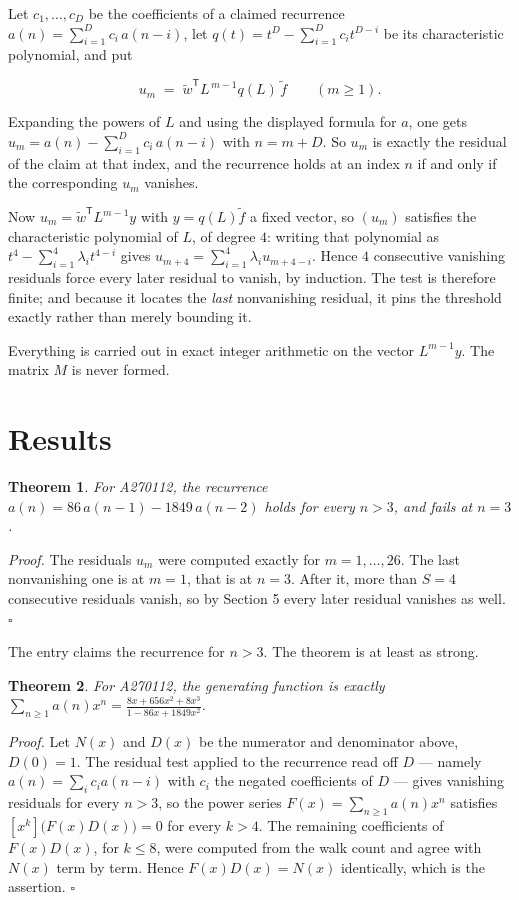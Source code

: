 \documentclass[11pt]{article}
\newtheorem{theorem}{Theorem}
\theoremstyle{definition}
\begin{document}
Let $c_1,\dots,c_D$ be the coefficients of a claimed recurrence $a(n) = \sum_{i=1}^{D} c_i\,a(n-i)$, let $q(t) = t^{D} - \sum_{i=1}^{D} c_i t^{D-i}$ be its characteristic polynomial, and put

\[u_m \;=\; \tilde w^{\mathsf T} L^{\,m-1} q(L)\,\tilde f \qquad (m \ge 1).\]

Expanding the powers of $L$ and using the displayed formula for $a$, one gets $u_m = a(n) - \sum_{i=1}^{D} c_i\,a(n-i)$ with $n = m + D$. So $u_m$ is exactly the residual of the claim at that index, and the recurrence holds at an index $n$ if and only if the corresponding $u_m$ vanishes.

Now $u_m = \tilde w^{\mathsf T} L^{m-1} y$ with $y = q(L)\tilde f$ a fixed vector, so $(u_m)$ satisfies the characteristic polynomial of $L$, of degree $4$: writing that polynomial as $t^{4} - \sum_{i=1}^{4} \lambda_i t^{4-i}$ gives $u_{m+4} = \sum_{i=1}^{4} \lambda_i u_{m+4-i}$. Hence $4$ consecutive vanishing residuals force every later residual to vanish, by induction. The test is therefore finite; and because it locates the {\itshape last} nonvanishing residual, it pins the threshold exactly rather than merely bounding it.

Everything is carried out in exact integer arithmetic on the vector $L^{m-1}y$. The matrix $M$ is never formed.

\section{Results}

\begin{theorem} For A270112, the recurrence $a(n) = 86\,a(n-1) - 1849\,a(n-2)$ holds for every $n > 3$, and fails at $n = 3$.\end{theorem}

{\itshape Proof.} The residuals $u_m$ were computed exactly for $m = 1,\dots,26$. The last nonvanishing one is at $m = 1$, that is at $n = 3$. After it, more than $S = 4$ consecutive residuals vanish, so by Section 5 every later residual vanishes as well. $\square$

The entry claims the recurrence for $n > 3$. The theorem is at least as strong.

\begin{theorem} For A270112, the generating function is exactly $\sum_{n\ge 1} a(n)x^n = \frac{8x + 656x^{2} + 8x^{3}}{1 - 86x + 1849x^{2}}$.\end{theorem}

{\itshape Proof.} Let $N(x)$ and $D(x)$ be the numerator and denominator above, $D(0)=1$. The residual test applied to the recurrence read off $D$ --- namely $a(n) = \sum_i c_i a(n-i)$ with $c_i$ the negated coefficients of $D$ --- gives vanishing residuals for every $n > 3$, so the power series $F(x)=\sum_{n\ge 1}a(n)x^n$ satisfies $[x^k]\bigl(F(x)D(x)\bigr) = 0$ for every $k > 4$. The remaining coefficients of $F(x)D(x)$, for $k \le 8$, were computed from the walk count and agree with $N(x)$ term by term. Hence $F(x)D(x) = N(x)$ identically, which is the assertion. $\square$
\end{document}
